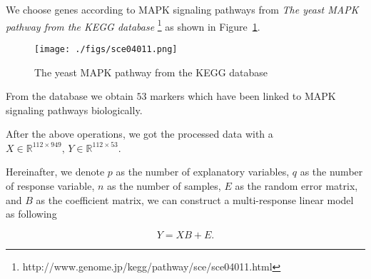 We choose genes according to MAPK signaling pathways \citep{kanehisa2013data} from \emph{The yeast MAPK pathway from the KEGG database} \footnote[1]{http://www.genome.jp/kegg/pathway/sce/sce04011.html} as shown in Figure~\ref{fig:MAPK}. 

\begin{figure}[ht]
    \centering
    \texttt{[image: ./figs/sce04011.png]}
    \caption{The yeast MAPK pathway from the KEGG database}
    \label{fig:MAPK}
\end{figure}

From the database we obtain $53$ markers which have been linked to MAPK signaling pathways biologically. 

After the above operations, we got the processed data with a $X\in\mathbb{R}^{112 \times 949} ,\, Y\in\mathbb{R}^{112 \times 53}$. 

Hereinafter, we denote $p$ as the number of explanatory variables, $q$ as the number of response variable, $n$ as the number of samples, $E$ as the random error matrix, and $B$ as the coefficient matrix, we can construct a multi-response linear model as following

\begin{equation}\label{eq:model}
    Y = XB + E. 
\end{equation}